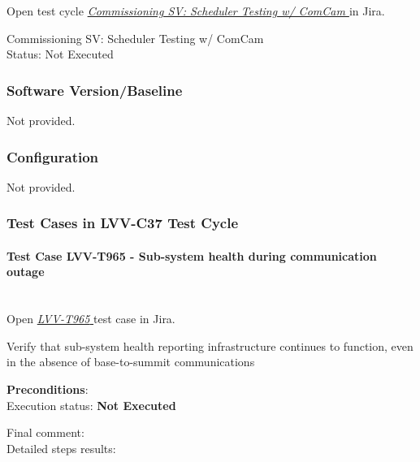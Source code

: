 \documentclass[DM,lsstdraft,STR,toc]{lsstdoc}
\begin{document}
Open test cycle {\it \href{https://jira.lsstcorp.org/secure/Tests.jspa#/testrun/LVV-C37}{Commissioning SV: Scheduler Testing w/ ComCam
}} in Jira.

Commissioning SV: Scheduler Testing w/ ComCam
\\
Status: Not Executed



\subsubsection{Software Version/Baseline}
Not provided.

\subsubsection{Configuration}
Not provided.

\subsubsection{Test Cases in LVV-C37 Test Cycle}

\paragraph{Test Case LVV-T965 - Sub-system health during communication outage
 }\mbox{}\\

Open  \href{https://jira.lsstcorp.org/secure/Tests.jspa#/testCase/LVV-T965}{\textit{ LVV-T965 } }
test case in Jira.

Verify that sub-system health reporting infrastructure continues to
function, even in the absence of base-to-summit communications


\textbf{ Preconditions}:\\


Execution status: {\bf Not Executed }

Final comment:\\


Detailed steps results:
\end{document}
